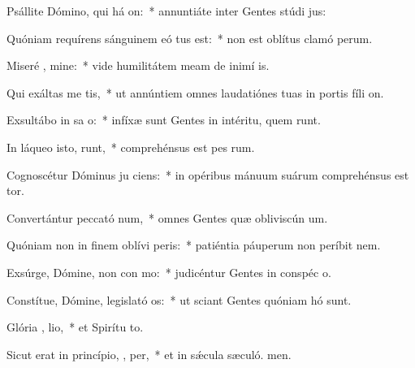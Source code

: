 \item Psállite Dómino, qui há  on:~* annuntiáte inter Gentes stúdi jus:
\item Quóniam requírens sánguinem eó tus est:~* non est oblítus clamó perum.
\item Miseré , mine:~* vide humilitátem meam de inimí is.
\item Qui exáltas me   tis,~* ut annúntiem omnes laudatiónes tuas in portis fíli on.
\item Exsultábo in sa o:~* infíxæ sunt Gentes in intéritu, quem runt.
\item In láqueo isto,  runt,~* comprehénsus est pes rum.
\item Cognoscétur Dóminus ju ciens:~* in opéribus mánuum suárum comprehénsus est tor.
\item Convertántur peccató  num,~* omnes Gentes quæ obliviscún um.
\item Quóniam non in finem oblívi  peris:~* patiéntia páuperum non períbit  nem.
\item Exsúrge, Dómine, non con mo:~* judicéntur Gentes in conspéc o.
\item Constítue, Dómine, legislató  os:~* ut sciant Gentes quóniam hó sunt.
\item Glória ,  lio,~* et Spirítu to.
\item Sicut erat in princípio,  ,  per,~* et in sǽcula sæculó. men.
